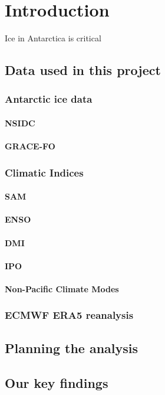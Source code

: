\documentclass[../main.tex]{subfiles}
\begin{document}
\chapter{Introduction}
Ice in Antarctica is critical 
\pagebreak
\section{Data used in this project}

\subsection{Antarctic ice data}
\subsubsection*{NSIDC}
\subsubsection*{GRACE-FO}

\subsection{Climatic Indices}
\subsubsection*{SAM}
\subsubsection*{ENSO}
\subsubsection*{DMI}
\subsubsection*{IPO}
\subsubsection*{Non-Pacific Climate Modes}

\subsection{ECMWF ERA5 reanalysis}

\section{Planning the analysis}

\section{Our key findings}
\end{document}
